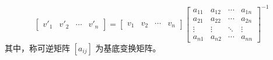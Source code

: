 \begin{definition}[坐标变换矩阵]
\[    \]
    \[
        \begin{bmatrix}
            v'_1 & v'_2 & \cdots & v'_n
        \end{bmatrix} =
        \begin{bmatrix}
            v_1 & v_2 & \cdots & v_n
        \end{bmatrix}
        \begin{bmatrix}
            a_{11} & a_{12} & \cdots & a_{1n} \\
            a_{21} & a_{22} & \cdots & a_{2n} \\
            \vdots & \vdots & \ddots & \vdots \\
            a_{n1} & a_{n2} & \cdots & a_{nn}
        \end{bmatrix}^{-1}
    \]
    其中，称可逆矩阵 $[a_{ij}]$ 为基底变换矩阵。
\end{definition}

\newpage